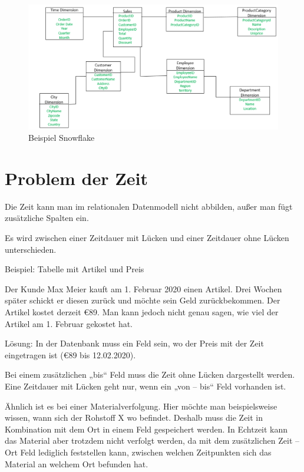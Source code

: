 \begin{figure}[H]
    \centering
    \includegraphics[width=.4\textwidth]{Content/images/modellierung/starb.png}
    \caption{Beispiel Snowflake}
    \label{fig:modellierung:starb}
\end{figure}

\section{Problem der Zeit}

Die Zeit kann man im relationalen Datenmodell nicht abbilden, außer man fügt zusätzliche Spalten ein. 

Es wird zwischen einer Zeitdauer mit Lücken und einer Zeitdauer ohne Lücken unterschieden. 

Beispiel: Tabelle mit Artikel und Preis

Der Kunde Max Meier kauft am 1. Februar 2020 einen Artikel. Drei Wochen später schickt er diesen zurück und möchte sein Geld zurückbekommen. Der Artikel kostet derzeit \euro{89}. Man kann jedoch nicht genau sagen, wie viel der Artikel am 1. Februar gekostet hat.

Lösung: In der Datenbank muss ein Feld sein, wo der Preis mit der Zeit eingetragen ist (\euro{89} bis 12.02.2020).

Bei einem zusätzlichen „bis“ Feld muss die Zeit ohne Lücken dargestellt werden. Eine Zeitdauer mit Lücken geht nur, wenn ein „von – bis“ Feld vorhanden ist.

Ähnlich ist es bei einer Materialverfolgung. Hier möchte man beispielsweise wissen, wann sich der Rohstoff X wo befindet. Deshalb muss die Zeit in Kombination mit dem Ort in einem Feld gespeichert werden. In Echtzeit kann das Material aber trotzdem nicht verfolgt werden, da mit dem zusätzlichen Zeit – Ort Feld lediglich feststellen kann, zwischen welchen Zeitpunkten sich das Material an welchem Ort befunden hat.
